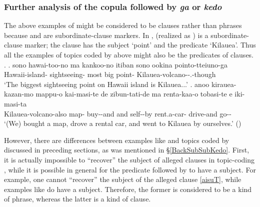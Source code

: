
\subsubsection{Further analysis of the copula followed by \textit{ga} or \textit{kedo}}

The above examples of  might be considered to be clauses rather than phrases
because  and  are subordinate-clause markers.
In \Next,
 (realized as ) is a subordinate-clause marker;
the clause has the subject  `point' and the predicate  `Kilauea'.
Thus all the examples of topics coded by  above might also be the predicates of  clauses.
%
\ex. \ag. sono hawai-too-no ma kankoo-no itiban sono ookina pointo-tteiuno-ga  \\
		 Hawaii-island-  sightseeing- most  big point- Kilauea-volcano--.-though \\
		`The biggest sightseeing point on Hawaii island is Kilauea...'
	\bg. anoo kirauea-kazan-mo mappu-o kai-masi-te de zibun-tati-de ma renta-kaa-o tobasi-te e iki-masi-ta \\
	 Kilauea-volcano-also map- buy--and and self--by  rent.a-car- drive-and  go-- \\
	`(We) bought a map, drove a rental car, and went to Kilauea by ourselves.'
		\hfill{()}

However, there are differences between examples like \Last[a]
and topics coded by  discussed in preceding sections,
as was mentioned in \S \ref{BackSubSubKedo}.
First,
it is actually impossible to ``recover'' the subject of alleged  clauses in topic-coding ,
while it is possible in general for the  predicate followed by  to have a subject.
For example,
one cannot ``recover'' the subject of the alleged  clause \ref{aisuT},
while examples like \Last[a] do have a subject.
Therefore,
the former is considered to be a kind of phrase,
whereas the latter is a kind of clause.

